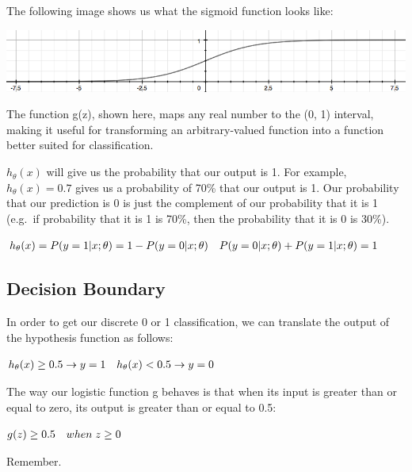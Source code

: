 \documentclass[
]{article}
\begin{document}
The following image shows us what the sigmoid function looks like:

\includegraphics{Sigmoid_function.png}

The function g(z), shown here, maps any real number to the (0, 1)
interval, making it useful for transforming an arbitrary-valued function
into a function better suited for classification.

\(h_\theta(x)\) will give us the probability that our output is 1. For
example, \(h_\theta(x)=0.7\) gives us a probability of 70\% that our
output is 1. Our probability that our prediction is 0 is just the
complement of our probability that it is 1 (e.g.~if probability that it
is 1 is 70\%, then the probability that it is 0 is 30\%).

\(\begin{align*}& h_\theta(x) = P(y=1 | x ; \theta) = 1 - P(y=0 | x ; \theta) \newline& P(y = 0 | x;\theta) + P(y = 1 | x ; \theta) = 1\end{align*}\)

\hypertarget{decision-boundary}{%
\subsection{Decision Boundary}\label{decision-boundary}}

In order to get our discrete 0 or 1 classification, we can translate the
output of the hypothesis function as follows:

\(\begin{align*}& h_\theta(x) \geq 0.5 \rightarrow y = 1 \newline& h_\theta(x) < 0.5 \rightarrow y = 0 \newline\end{align*}\)

The way our logistic function g behaves is that when its input is
greater than or equal to zero, its output is greater than or equal to
0.5:

\(\begin{align*}& g(z) \geq 0.5 \newline& when \; z \geq 0\end{align*}\)

Remember.
\end{document}
